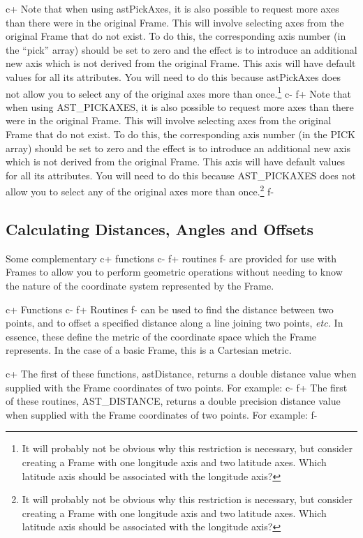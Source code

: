 \documentclass[twoside,11pt]{article}
\begin{document}
c+
Note that when using astPickAxes, it is also possible to request more
axes than there were in the original Frame. This will involve
selecting axes from the original Frame that do not exist. To do this,
the corresponding axis number (in the ``pick'' array) should be set to
zero and the effect is to introduce an additional new axis which is
not derived from the original Frame. This axis will have default
values for all its attributes. You will need to do this because
astPickAxes does not allow you to select any of the original axes more
than once.\footnote{It will probably not be obvious why this
restriction is necessary, but consider creating a Frame with one
longitude axis and two latitude axes. Which latitude axis should be
associated with the longitude axis?}
c-
f+
Note that when using AST\_PICKAXES, it is also possible to request
more axes than there were in the original Frame. This will involve
selecting axes from the original Frame that do not exist. To do this,
the corresponding axis number (in the PICK array) should be set to
zero and the effect is to introduce an additional new axis which is
not derived from the original Frame. This axis will have default
values for all its attributes. You will need to do this because
AST\_PICKAXES does not allow you to select any of the original axes
more than once.\footnote{It will probably not be obvious why this
restriction is necessary, but consider creating a Frame with one
longitude axis and two latitude axes. Which latitude axis should be
associated with the longitude axis?}
f-

\subsection{\label{ss:distanceandoffset}Calculating Distances, Angles and Offsets}
Some complementary
c+
functions
c-
f+
routines
f-
are provided for use with Frames to allow you to perform geometric
operations without needing to know the nature of the coordinate system
represented by the Frame.

c+
Functions
c-
f+
Routines
f-
can be used to find the distance between two points, and to offset a
specified distance along a line joining two points, {\em{etc.}} In essence,
these define the metric of the coordinate space which the Frame represents. In
the case of a basic Frame, this is a Cartesian metric.

c+
The first of these functions, astDistance, returns a double distance
value when supplied with the Frame coordinates of two points. For
example:
c-
f+
The first of these routines, AST\_DISTANCE, returns a double precision
distance value when supplied with the Frame coordinates of two
points. For example:
f-
\end{document}
